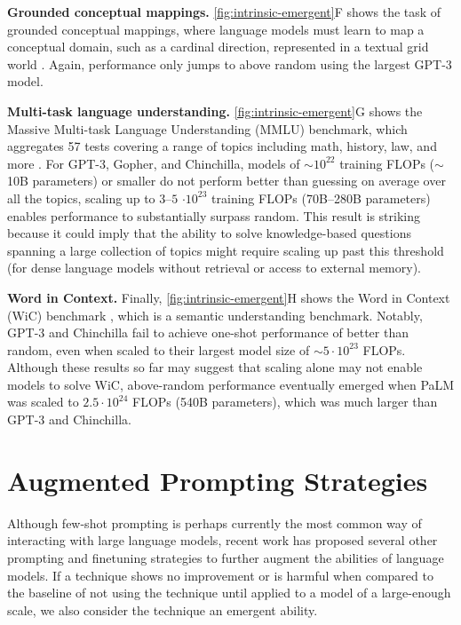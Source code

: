 \textbf{Grounded conceptual mappings.}
\ref{fig:intrinsic-emergent}F shows the task of grounded conceptual mappings, where language models must learn to map a conceptual domain, such as a cardinal direction, represented in a textual grid world \citep{patel2021mapping}. Again, performance only jumps to above random using the largest GPT-3 model.

\textbf{Multi-task language understanding.}
\ref{fig:intrinsic-emergent}G shows the Massive Multi-task Language Understanding (MMLU) benchmark, which aggregates 57 tests covering a range of topics including math, history, law, and more \citep{hendrycks2020measuring}. For GPT-3, Gopher, and Chinchilla, models of ${\sim}10^{22}$ training FLOPs ($\sim$10B parameters) or smaller do not perform better than guessing on average over all the topics, scaling up to $3$--$5$ $\cdot 10^{23}$ training FLOPs (70B--280B parameters) enables performance to substantially surpass random. This result is striking because it could imply that the ability to solve knowledge-based questions spanning a large collection of topics might require scaling up past this threshold (for dense language models without retrieval or access to external memory).

\textbf{Word in Context.} Finally, \ref{fig:intrinsic-emergent}H shows the Word in Context (WiC) benchmark \citep{pilehvar-camacho-collados-2019-wic}, which is a semantic understanding benchmark. Notably, GPT-3 and Chinchilla fail to achieve one-shot performance of better than random, even when scaled to their largest model size of ${\sim}5 \cdot 10^{23}$ FLOPs. Although these results so far may suggest that scaling alone may not enable models to solve WiC, above-random performance eventually emerged when PaLM was scaled to  $2.5 \cdot 10^{24}$ FLOPs (540B parameters), which was much larger than GPT-3 and Chinchilla.

\section{Augmented Prompting Strategies}\label{sec:interventions}

Although few-shot prompting is perhaps currently the most common way of interacting with large language models, recent work has proposed several other prompting and finetuning strategies to further augment the abilities of language models. If a technique shows no improvement or is harmful when compared to the baseline of not using the technique until applied to a model of a large-enough scale, we also consider the technique an emergent ability.

